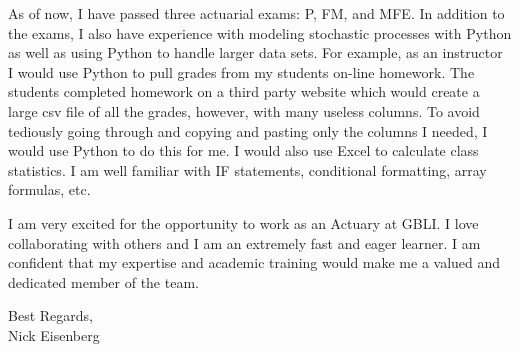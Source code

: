 \documentclass[letterpaper,12pt]{article}
\begin{document}
As of now, I have passed three actuarial exams: P, FM, and MFE. In addition to the exams, I also have experience with modeling stochastic processes with Python as well as using Python to handle larger data sets. For example, as an instructor I would use Python to pull grades from my students on-line homework. The students completed homework on a third party website which would create a large csv file of all the grades, however, with many useless columns. To avoid tediously going through and copying and pasting only the columns I needed, I would use Python to do this for me. I would also use Excel to calculate class statistics. I am well familiar with IF statements, conditional formatting, array formulas, etc. 

\vspace{.1in}
I am very excited for the opportunity to work as an Actuary at GBLI. I love collaborating with others and I am an extremely fast and eager learner. I am confident that my expertise and academic training would make me a valued and dedicated member of the team.

\vspace{.2in}
Best Regards, \\
Nick Eisenberg 
\end{document}
